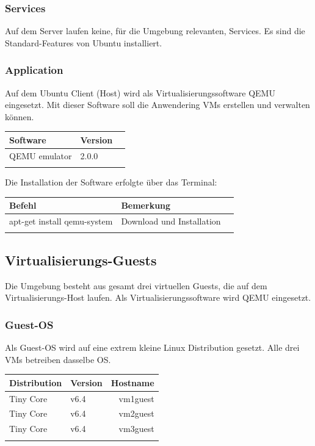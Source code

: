 \documentclass[a4,12pt]{scrartcl}
\begin{document}
\subsubsection{Services}
Auf dem Server laufen keine, für die Umgebung relevanten, Services. Es sind die Standard-Features von Ubuntu installiert.  

\subsubsection{Application}
Auf dem Ubuntu Client (Host) wird als Virtualisierungssoftware QEMU eingesetzt. Mit dieser Software soll die Anwendering VMs erstellen und verwalten können. 
\begin{center}
    \begin{tabular}{@{} l l r@{}}\toprule    
    {Software} & {Version}\\ \midrule
    QEMU emulator & 2.0.0\\ \addlinespace
    \bottomrule
    \end{tabular}
\end{center}
Die Installation der Software erfolgte über das Terminal: 
\begin{center}
    \begin{tabular}{@{} l l r@{}}\toprule    
    {Befehl} & {Bemerkung}\\ \midrule
    apt-get install qemu-system & Download und Installation\\
     \addlinespace
    \bottomrule
    \end{tabular}
\end{center}

\subsection{Virtualisierungs-Guests}
Die Umgebung besteht aus gesamt drei virtuellen Guests, die auf dem Virtualisierungs-Host laufen. Als Virtualisierungssoftware wird QEMU eingesetzt. 

\subsubsection{Guest-OS}
Als Guest-OS wird auf eine extrem kleine Linux Distribution gesetzt. Alle drei VMs betreiben dasselbe OS. 
\begin{center}
    \begin{tabular}{@{} l l r@{}}\toprule    
    {Distribution} & {Version} & {Hostname}\\ \toprule
    Tiny Core & v6.4 & vm1guest\\ 
    Tiny Core & v6.4 & vm2guest\\
    Tiny Core & v6.4 & vm3guest\\ \addlinespace
    \bottomrule
    \end{tabular}
\end{center}
\end{document}
